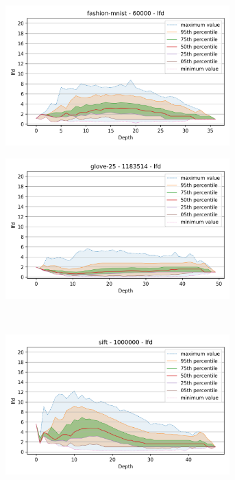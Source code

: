 \begin{figure}
    \begin{subfigure}[b]{0.47\textwidth}
    \includegraphics[width=0.95\textwidth]{images/lfd_plots/fashion-mnist-60000-lfd.png}\\
    \label{fig:results:fashion-mnist-lfd}
    \end{subfigure}%
    \begin{subfigure}[b]{0.47\textwidth}
    \includegraphics[width=0.95\textwidth]{images/lfd_plots/glove-25-1183514-lfd.png}\\
    \label{fig:results:glove-25-lfd}
    \end{subfigure}
    \\
    \begin{subfigure}[b]{0.47\textwidth}
    \includegraphics[width=0.95\textwidth]{images/lfd_plots/sift-1000000-lfd.png}\\

\end{subfigure}
\end{figure}

